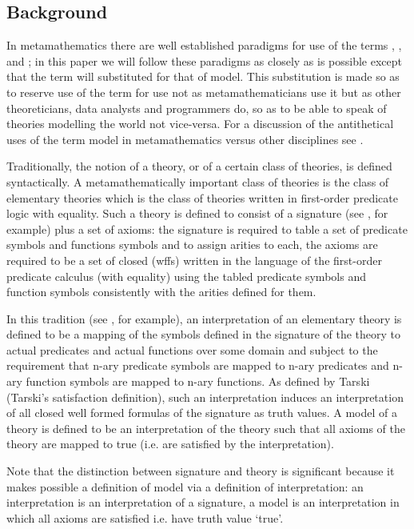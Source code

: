 \subsection{Background}
\note  In metamathematics there are well established paradigms for use of the terms
, ,  and ;
in this paper  we will follow these paradigms as closely as is possible except that the term  will substituted  for that of model. 
This substitution is made so as to reserve use of the term  for  use not as metamathematicians 
use it but as other theoreticians, data analysts and programmers do, so as to be able to speak of theories modelling 
the world not vice-versa. For a discussion of the antithetical uses of the term model in metamathematics versus other disciplines see \cite{HodgesModelTheory}.

Traditionally, the notion of a theory, or of a certain class of theories, is  defined syntactically.
A metamathematically important class of theories  is the class of elementary theories 
which is the class of theories written in first-order predicate logic with equality. 
Such a theory is defined to consist of a signature (see \cite{HodgesModelTheory}, for example) plus a set of axioms: 
the signature is required to table a set of predicate symbols and functions symbols and to assign arities to each, 
the axioms are required  to be a set of closed  (wffs) written
in the language of the first-order predicate calculus (with equality)
using the tabled predicate symbols and function symbols consistently with the arities defined for them. 

\note In this tradition (see \cite{Mendelson}, for example), an interpretation of an elementary theory is defined to be a mapping of the symbols defined in the signature 
of the theory to actual predicates and actual functions over some domain and subject to the requirement that n-ary predicate symbols are mapped to n-ary predicates and n-ary function symbols are mapped to n-ary functions.
As defined by Tarski (Tarski's satisfaction definition), 
such an interpretation induces an interpretation of all
closed well formed formulas of the signature as truth values. 
A model of a theory is defined to be an interpretation of the theory such that all axioms of the theory are mapped to true (i.e. are satisfied by the interpretation). 

\note
Note that the distinction between signature and theory is significant because it makes possible a definition of model 
via a definition of interpretation: an interpretation is an interpretation of a signature, 
a model is an interpretation in which all axioms are satisfied i.e. have truth value `true'.   


